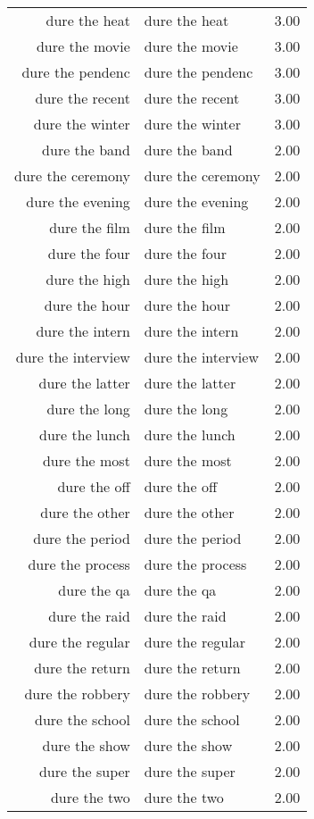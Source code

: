 \begin{table}[ht]
\begin{tabular}{rlr}
  dure the heat & dure the heat & 3.00 \\ 
  dure the movie & dure the movie & 3.00 \\ 
  dure the pendenc & dure the pendenc & 3.00 \\ 
  dure the recent & dure the recent & 3.00 \\ 
  dure the winter & dure the winter & 3.00 \\ 
  dure the band & dure the band & 2.00 \\ 
  dure the ceremony & dure the ceremony & 2.00 \\ 
  dure the evening & dure the evening & 2.00 \\ 
  dure the film & dure the film & 2.00 \\ 
  dure the four & dure the four & 2.00 \\ 
  dure the high & dure the high & 2.00 \\ 
  dure the hour & dure the hour & 2.00 \\ 
  dure the intern & dure the intern & 2.00 \\ 
  dure the interview & dure the interview & 2.00 \\ 
  dure the latter & dure the latter & 2.00 \\ 
  dure the long & dure the long & 2.00 \\ 
  dure the lunch & dure the lunch & 2.00 \\ 
  dure the most & dure the most & 2.00 \\ 
  dure the off & dure the off & 2.00 \\ 
  dure the other & dure the other & 2.00 \\ 
  dure the period & dure the period & 2.00 \\ 
  dure the process & dure the process & 2.00 \\ 
  dure the qa & dure the qa & 2.00 \\ 
  dure the raid & dure the raid & 2.00 \\ 
  dure the regular & dure the regular & 2.00 \\ 
  dure the return & dure the return & 2.00 \\ 
  dure the robbery & dure the robbery & 2.00 \\ 
  dure the school & dure the school & 2.00 \\ 
  dure the show & dure the show & 2.00 \\ 
  dure the super & dure the super & 2.00 \\ 
  dure the two & dure the two & 2.00 \\ 

\end{tabular}
\end{table}
